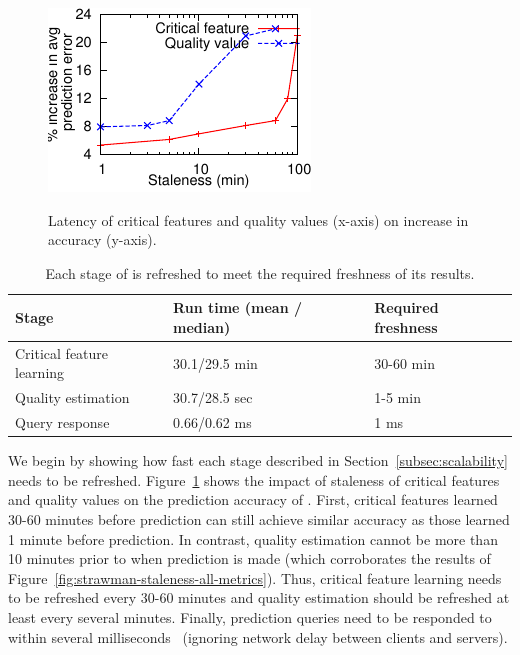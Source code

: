 \begin{figure}[t!]
{
\includegraphics[width=.4\textwidth]{figures/cfa-insight-staleness-impact-3.pdf}
        \label{subfig:Imp-cfImp-2}
}
\caption{Latency of critical features and quality values 
(x-axis) on increase in accuracy (y-axis).}
\label{fig:insight-staleness}
\end{figure}


\begin{table}[t!]
\begin{center}
\begin{tabular}{p{2in}|p{2in}|p{2in}}
{\bf Stage} & {\bf Run time (mean / median)} & {\bf Required freshness} \\ \hline \hline
Critical feature learning & 30.1/29.5 min & 30-60 min \\
Quality estimation  &  30.7/28.5 sec & 1-5 min \\
Query response	 &  0.66/0.62 ms & 1 ms
\end{tabular}
\caption{Each stage of \dda is refreshed to meet the 
required freshness of its results.}
\label{tab:response-all}
\end{center}
\end{table}


We begin by showing how fast each stage described 
in Section~\ref{subsec:scalability} needs to be refreshed. 
Figure~\ref{fig:insight-staleness} shows the impact of 
staleness of critical features and quality values on the 
prediction accuracy of \dda. 
First, critical features learned 30-60 minutes before 
prediction can still achieve similar accuracy as those 
learned 1 minute before prediction. 
In contrast, quality estimation cannot be more than 
10 minutes prior to when prediction is made (which 
corroborates the results of 
Figure~\ref{fig:strawman-staleness-all-metrics}). 
Thus, critical feature learning needs to be refreshed 
every 30-60 minutes and quality estimation should be 
refreshed at least every several minutes. 
Finally, prediction queries need to be responded to within 
several milliseconds~\cite{c3} (ignoring network delay 
between clients and servers).




